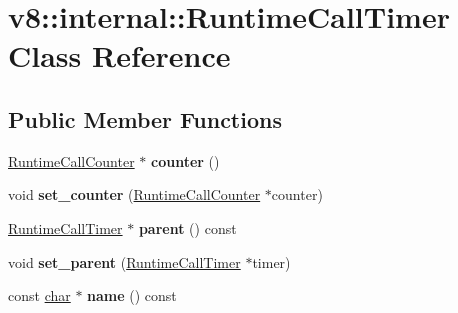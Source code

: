 \hypertarget{classv8_1_1internal_1_1RuntimeCallTimer}{}\section{v8\+:\+:internal\+:\+:Runtime\+Call\+Timer Class Reference}
\label{classv8_1_1internal_1_1RuntimeCallTimer}
\subsection*{Public Member Functions}
\begin{DoxyCompactItemize}
\item 
\mbox{\label{classv8_1_1internal_1_1RuntimeCallTimer_a58c33415c0c7956e8a166f0b85e95448}} 
\mbox{\hyperlink{classv8_1_1internal_1_1RuntimeCallCounter}{Runtime\+Call\+Counter}} $\ast$ {\bfseries counter} ()
\item 
\mbox{\label{classv8_1_1internal_1_1RuntimeCallTimer_a28c59965e00446c32a0cd3f6c4d648ce}} 
void {\bfseries set\+\_\+counter} (\mbox{\hyperlink{classv8_1_1internal_1_1RuntimeCallCounter}{Runtime\+Call\+Counter}} $\ast$counter)
\item 
\mbox{\label{classv8_1_1internal_1_1RuntimeCallTimer_ab79975e763cd537259ecf6f264786c9f}} 
\mbox{\hyperlink{classv8_1_1internal_1_1RuntimeCallTimer}{Runtime\+Call\+Timer}} $\ast$ {\bfseries parent} () const
\item 
\mbox{\label{classv8_1_1internal_1_1RuntimeCallTimer_a7324817011df759993447a92d53a6d45}} 
void {\bfseries set\+\_\+parent} (\mbox{\hyperlink{classv8_1_1internal_1_1RuntimeCallTimer}{Runtime\+Call\+Timer}} $\ast$timer)
\item 
\mbox{\label{classv8_1_1internal_1_1RuntimeCallTimer_ac6d6044b1054c5cc149f8db80551717e}} 
const \mbox{\hyperlink{classchar}{char}} $\ast$ {\bfseries name} () const
\item 
\mbox{\label{classv8_1_1internal_1_1RuntimeCallTimer_a2a9bf65370ce4d9ebc298661c7ec9d66}} 

\end{DoxyCompactItemize}

